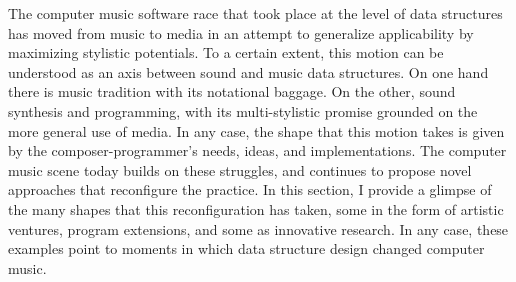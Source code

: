 The computer music software race that took place at the level of data structures has moved from music to media in an attempt to generalize applicability by maximizing stylistic potentials. To a certain extent, this motion can be understood as an axis between sound and music data structures. On one hand there is music tradition with its notational baggage. On the other, sound synthesis and programming, with its multi-stylistic promise grounded on the more general use of media. In any case, the shape that this motion takes is given by the composer-programmer's needs, ideas, and implementations. The computer music scene today builds on these struggles, and continues to propose novel approaches that reconfigure the practice. In this section, I provide a glimpse of the many shapes that this reconfiguration has taken, some in the form of artistic ventures, program extensions, and some as innovative research. In any case, these examples point to moments in which data structure design changed computer music.



% 
% 


% 







